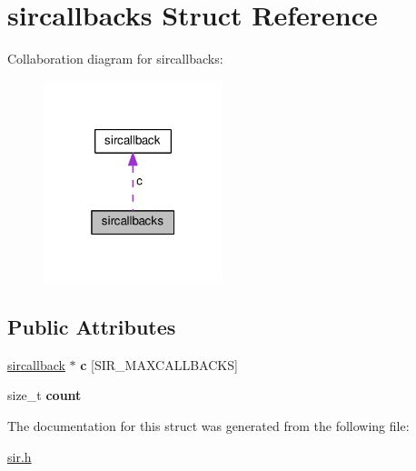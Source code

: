 \hypertarget{structsircallbacks}{}\section{sircallbacks Struct Reference}
\label{structsircallbacks}


Collaboration diagram for sircallbacks\+:\nopagebreak
\begin{figure}[H]
\begin{center}
\leavevmode
\includegraphics[width=148pt]{structsircallbacks__coll__graph}
\end{center}
\end{figure}
\subsection*{Public Attributes}
\begin{DoxyCompactItemize}
\item 
\hyperlink{structsircallback}{sircallback} $\ast$ {\bfseries c} \mbox{[}S\+I\+R\+\_\+\+M\+A\+X\+C\+A\+L\+L\+B\+A\+C\+KS\mbox{]}\hypertarget{structsircallbacks_a6e31f58637668ff6b9c4829f5a1ac4d7}{}\label{structsircallbacks_a6e31f58637668ff6b9c4829f5a1ac4d7}

\item 
size\+\_\+t {\bfseries count}\hypertarget{structsircallbacks_a2da7cd36b0b3db1ef158a700b4d61f07}{}\label{structsircallbacks_a2da7cd36b0b3db1ef158a700b4d61f07}

\end{DoxyCompactItemize}


The documentation for this struct was generated from the following file\+:\begin{DoxyCompactItemize}
\item 
\hyperlink{sir_8h}{sir.\+h}\end{DoxyCompactItemize}
